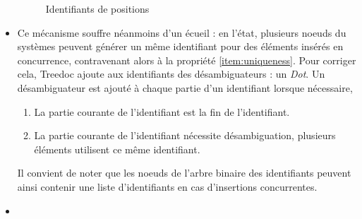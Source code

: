 \begin{itemize}
\begin{figure}[!ht]
      \centering
      \caption{Identifiants de positions}
      \label{fig:treedoc-ids}
    \end{figure}
  \item Ce mécanisme souffre néanmoins d'un écueil : en l'état, plusieurs noeuds du systèmes peuvent générer un même identifiant pour des éléments insérés en concurrence, contravenant alors à la propriété \ref{item:uniqueness}.
    Pour corriger cela, Treedoc ajoute aux identifiants des désambiguateurs : un \emph{Dot}.
    Un désambiguateur est ajouté à chaque partie d'un identifiant lorsque nécessaire, \ie
    \begin{enumerate}[label=(\roman*)]
      \item La partie courante de l'identifiant est la fin de l'identifiant.
      \item La partie courante de l'identifiant nécessite désambiguation, \ie plusieurs éléments utilisent ce même identifiant.
    \end{enumerate}
    Il convient de noter que les noeuds de l'arbre binaire des identifiants peuvent ainsi contenir une liste d'identifiants en cas d'insertions concurrentes.
  \item
    \begin{figure}[!ht]

      \centering
\end{figure}
\end{itemize}

